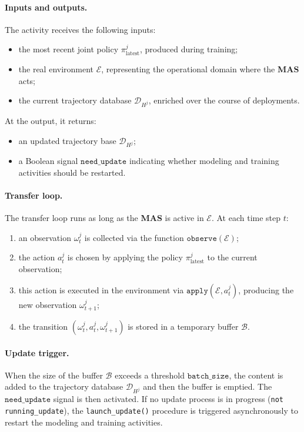 \documentclass[pdflatex,sn-mathphys-num]{sn-jnl}%
\theoremstyle{thmstyleone}%
\theoremstyle{thmstyletwo}%
\theoremstyle{thmstylethree}%
\begin{document}
\paragraph*{Inputs and outputs.}
The activity receives the following inputs:
\begin{itemize}
    \item the most recent joint policy $\pi^j_{\text{latest}}$, produced during training;
    \item the real environment $\mathcal{E}$, representing the operational domain where the \textbf{MAS} acts;
    \item the current trajectory database $\mathcal{D}_{H^j}$, enriched over the course of deployments.
\end{itemize}
At the output, it returns:
\begin{itemize}
    \item an updated trajectory base $\mathcal{D}_{H^j}$;
    \item a Boolean signal $\texttt{need\_update}$ indicating whether modeling and training activities should be restarted.
\end{itemize}

\paragraph*{Transfer loop.}
The transfer loop runs as long as the \textbf{MAS} is active in $\mathcal{E}$.
At each time step $t$:
\begin{enumerate}
    \item an observation $\omega^j_t$ is collected via the function $\texttt{observe}(\mathcal{E})$;
    \item the action $a^j_t$ is chosen by applying the policy $\pi^j_{\text{latest}}$ to the current observation;
    \item this action is executed in the environment via $\texttt{apply}(\mathcal{E}, a^j_t)$, producing the new observation $\omega^j_{t+1}$;
    \item the transition $(\omega^j_t, a^j_t, \omega^j_{t+1})$ is stored in a temporary buffer $\mathcal{B}$.
\end{enumerate}

\paragraph*{Update trigger.}
When the size of the buffer $\mathcal{B}$ exceeds a threshold $\texttt{batch\_size}$, the content is added to the trajectory database $\mathcal{D}_{H^j}$ and then the buffer is emptied.
The $\texttt{need\_update}$ signal is then activated.
If no update process is in progress (\texttt{not running\_update}), the \texttt{launch\_update()} procedure is triggered asynchronously to restart the modeling and training activities.
\end{document}
